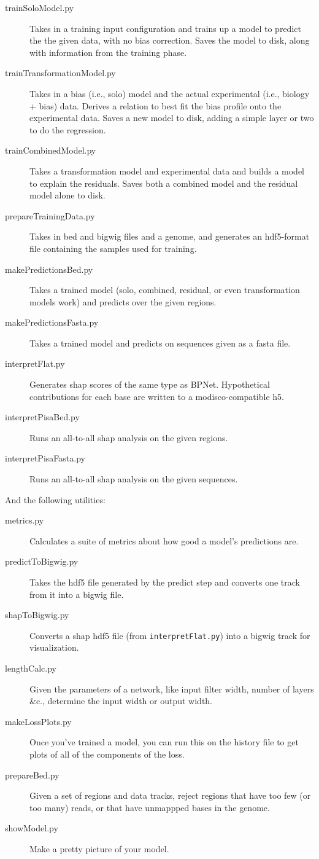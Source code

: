 \documentclass{article}
\begin{document}
\begin{description}
    \item [trainSoloModel.py] Takes in a training input configuration and trains up a model to predict the the given data, with no bias correction. Saves the model to disk, along with information from the training phase. 
    \item [trainTransformationModel.py] Takes in a bias (i.e., solo) model and the actual experimental (i.e., biology + bias) data. Derives a relation to best fit the bias profile onto the experimental data. Saves a new model to disk, adding a simple layer or two to do the regression. 
    \item [trainCombinedModel.py] Takes a transformation model and experimental data and builds a model to explain the residuals. Saves both a combined model and the residual model alone to disk.
    \item [prepareTrainingData.py] Takes in bed and bigwig files and a genome, and generates an hdf5-format file containing the samples used for training.  
    \item [makePredictionsBed.py] Takes a trained model (solo, combined, residual, or even transformation models work) and predicts over the given regions. 
    \item [makePredictionsFasta.py] Takes a trained model and predicts on sequences given as a fasta file.
    \item [interpretFlat.py] Generates shap scores of the same type as BPNet. Hypothetical contributions for each base are written to a modisco-compatible h5. 
    \item [interpretPisaBed.py] Runs an all-to-all shap analysis on the given regions. 
    \item [interpretPisaFasta.py] Runs an all-to-all shap analysis on the given sequences. 
\end{description}

And the following utilities:

\begin{description}
    \item [metrics.py] Calculates a suite of metrics about how good a model's predictions are. 
    \item [predictToBigwig.py] Takes the hdf5 file generated by the predict step and converts one track from it into a bigwig file.
    \item [shapToBigwig.py] Converts a shap hdf5 file (from \texttt{interpretFlat.py}) into a bigwig track for visualization. 
    \item [lengthCalc.py] Given the parameters of a network, like input filter width, number of layers \&c., determine the input width or output width.
    \item [makeLossPlots.py] Once you've trained a model, you can run this on the history file to get plots of all of the components of the loss. 
    \item [prepareBed.py] Given a set of regions and data tracks, reject regions that have too few (or too many) reads, or that have unmappped bases in the genome.
    \item [showModel.py] Make a pretty picture of your model.
\end{description}
\end{document}
